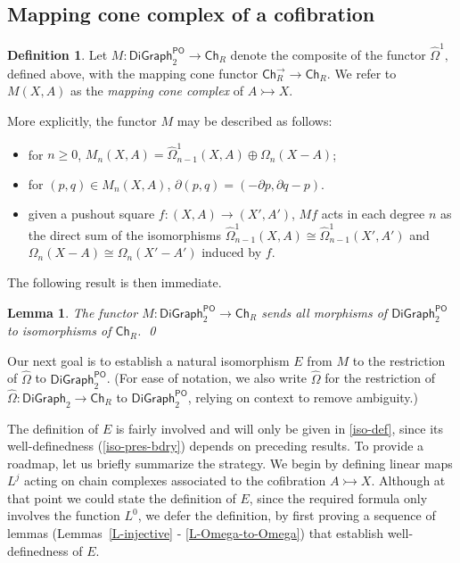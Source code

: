 \documentclass[11pt]{article}
\newtheorem{lemma}[theo]{Lemma}
\theoremstyle{definition}
\newtheorem{defi}[theo]{Definition}
\numberwithin{equation}{section}
\newcommand{\Ch}{\mathsf{Ch}}
\newcommand{\Cof}{\mathsf{DiGraph}_2}
\newcommand{\CofPO}{\mathsf{DiGraph}_2^{\mathsf{PO}}}
\newcommand{\tOmega}{\widehat{\Omega}}
\newcommand{\tOmegaOne}{\widehat{\Omega}^1}
\newcommand{\bd}{\partial}
\newcommand{\cto}{\rightarrowtail}
\begin{document}
\subsection{Mapping cone complex of a cofibration}

\begin{defi}\label{def:M}
Let $M \colon \CofPO \to \Ch_R$ denote the composite of the functor $\tOmegaOne,$ defined above, with the mapping cone functor $\Ch^{\rightarrow}_R \to \Ch_R$. 
We refer to $M(X, A)$ as the \emph{mapping cone complex} of $A \cto X$.
\end{defi}

More explicitly, the functor $M$ may be described as follows:
\begin{itemize}
    \item for $n \geq 0$, $M_n(X,A) = \tOmegaOne_{n-1}(X,A) \oplus \Omega_n(X-A)$;
    \item for $(p,q) \in M_n(X,A)$, $\bd(p,q) = (-\bd p, \bd q - p)$.
    \item given a pushout square $f \colon (X,A) \to (X',A')$, $Mf$ acts in each degree $n$ as the direct sum of the isomorphisms $\tOmegaOne_{n-1}(X,A) \cong \tOmegaOne_{n-1}(X',A')$ and $\Omega_n(X-A) \cong \Omega_n(X' - A')$ induced by $f$.
\end{itemize}

The following result is then immediate.

\begin{lemma}\label{mapping-cone-invariant}
The functor $M \colon \CofPO \to \Ch_R$ sends all morphisms of $\CofPO$ to isomorphisms of $\Ch_R$. \qed
\end{lemma}

Our next goal is to establish a natural isomorphism $E$ from $M$ to the restriction of $\tOmega$ to $\CofPO$.
(For ease of notation, we also write $\tOmega$ for the restriction of $\tOmega \colon \Cof \to \Ch_R$ to $\CofPO$, relying on context to remove ambiguity.) 

The definition of $E$ is fairly involved and will only be given in \cref{iso-def}, since its well-definedness (\cref{iso-pres-bdry}) depends on preceding results.
To provide a roadmap, let us briefly summarize the strategy.
We begin by defining linear maps $L^j$ acting on chain complexes associated to the cofibration $A \cto X$.
Although at that point we could state the definition of $E$, since the required formula only involves the function $L^0$, we defer the definition, by first proving a sequence of lemmas (Lemmas~\ref{L-injective} - \ref{L-Omega-to-Omega}) that establish well-definedness of $E.$
\end{document}
